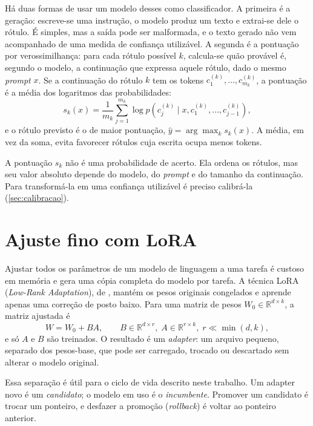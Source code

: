 Há duas formas de usar um modelo desses como classificador. A primeira é a geração: escreve-se uma instrução, o modelo produz um texto e extrai-se dele o rótulo. É simples, mas a saída pode ser malformada, e o texto gerado não vem acompanhado de uma medida de confiança utilizável. A segunda é a pontuação por verossimilhança: para cada rótulo possível $k$, calcula-se quão provável é, segundo o modelo, a continuação que expressa aquele rótulo, dado o mesmo \emph{prompt} $x$. Se a continuação do rótulo $k$ tem os tokens $c^{(k)}_1,\dots,c^{(k)}_{m_k}$, a pontuação é a média dos logaritmos das probabilidades:
\begin{equation}
  s_k(x) = \frac{1}{m_k}\sum_{j=1}^{m_k} \log p\!\left(c^{(k)}_j \mid x, c^{(k)}_1,\dots,c^{(k)}_{j-1}\right),
  \label{eq:pontuacao}
\end{equation}
e o rótulo previsto é o de maior pontuação, $\hat{y} = \arg\max_k s_k(x)$. A média, em vez da soma, evita favorecer rótulos cuja escrita ocupa menos tokens.

A pontuação $s_k$ não é uma probabilidade de acerto. Ela ordena os rótulos, mas seu valor absoluto depende do modelo, do \emph{prompt} e do tamanho da continuação. Para transformá-la em uma confiança utilizável é preciso calibrá-la (\autoref{sec:calibracao}).

\section{Ajuste fino com LoRA}

Ajustar todos os parâmetros de um modelo de linguagem a uma tarefa é custoso em memória e gera uma cópia completa do modelo por tarefa. A técnica LoRA (\emph{Low-Rank Adaptation}), de , mantém os pesos originais congelados e aprende apenas uma correção de posto baixo. Para uma matriz de pesos $W_0 \in \mathbb{R}^{d\times k}$, a matriz ajustada é
\begin{equation}
  W = W_0 + BA, \qquad B \in \mathbb{R}^{d\times r},\; A \in \mathbb{R}^{r\times k},\; r \ll \min(d,k),
\end{equation}
e só $A$ e $B$ são treinados. O resultado é um \emph{adapter}: um arquivo pequeno, separado dos pesos-base, que pode ser carregado, trocado ou descartado sem alterar o modelo original.

Essa separação é útil para o ciclo de vida descrito neste trabalho. Um adapter novo é um \emph{candidato}; o modelo em uso é o \emph{incumbente}. Promover um candidato é trocar um ponteiro, e desfazer a promoção (\emph{rollback}) é voltar ao ponteiro anterior.

